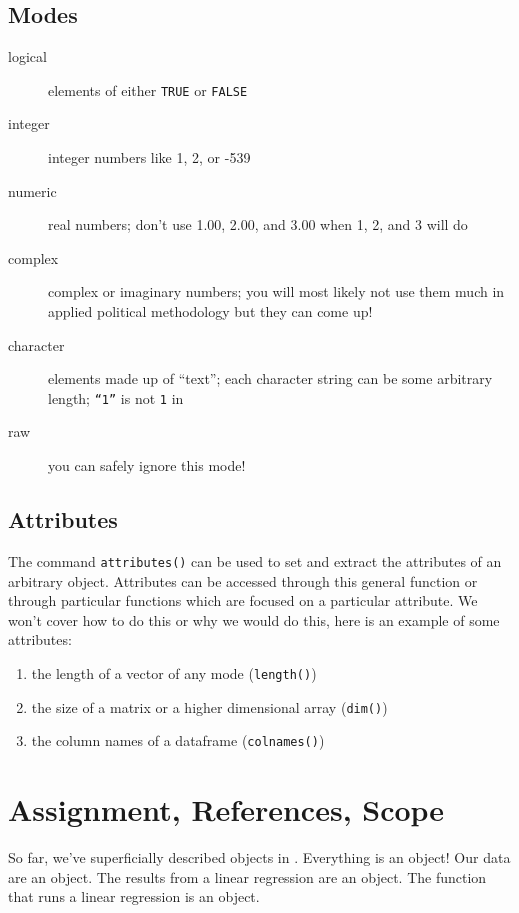 \subsection{Modes}

\begin{description}
\item[logical] elements of either \texttt{TRUE} or \texttt{FALSE}

\item[integer] integer numbers like 1, 2, or -539

\item[numeric] real numbers; don't use 1.00, 2.00, and 3.00 when
  1, 2, and 3 will do

\item[complex] complex or imaginary numbers; you will most likely not
  use them much in applied political methodology but they can come up!

\item[character] elements made up of ``text''; each character string
  can be some arbitrary length; \texttt{``1''} is not \texttt{1} in \R{}

\item[raw] you can safely ignore this mode!

\end{description}

\subsection{Attributes}

The command \texttt{attributes()} can be used to set and extract the
attributes of an arbitrary \R{} object. Attributes can be accessed
through this general function or through particular functions which
are focused on a particular attribute. We won't cover how to do this
or why we would do this, here is an example of some attributes:
\begin{enumerate}
\item the length of a vector of any mode (\texttt{length()})
\item the size of a matrix or a higher dimensional array (\texttt{dim()})
\item the column names of a dataframe (\texttt{colnames()})
\end{enumerate}

\section{Assignment, References, Scope}
So far, we've superficially described objects in \R{}. Everything is
an object! Our data are an object. The results from a linear
regression are an object. The function that runs a linear regression
is an object.

